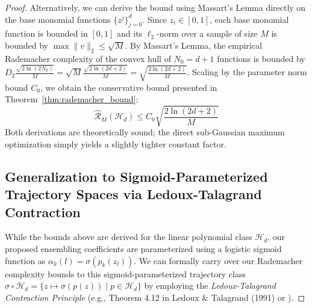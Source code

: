 \documentclass{article}
\theoremstyle{plain}
\theoremstyle{definition}
\theoremstyle{remark}
\begin{document}
\begin{proof}
Alternatively, we can derive the bound using Massart's Lemma directly on the base monomial functions $\{z^j\}_{j=0}^d$. Since $z_i \in [0, 1]$, each base monomial function is bounded in $[0, 1]$ and its $\ell_2$-norm over a sample of size $M$ is bounded by $\max \|v\|_2 \le \sqrt{M}$. By Massart's Lemma, the empirical Rademacher complexity of the convex hull of $N_0 = d+1$ functions is bounded by $D_2 \frac{\sqrt{2 \ln(2 N_0)}}{M} = \sqrt{M} \frac{\sqrt{2 \ln(2d+2)}}{M} = \sqrt{\frac{2 \ln(2d+2)}{M}}$. Scaling by the parameter norm bound $C_0$, we obtain the conservative bound presented in Theorem~\ref{thm:rademacher_bound}:
\begin{equation}
\widehat{\mathcal{R}}_M(\mathcal{H}_d) \le C_0 \sqrt{\frac{2 \ln(2 d + 2)}{M}}
\end{equation}
Both derivations are theoretically sound; the direct sub-Gaussian maximum optimization simply yields a slightly tighter constant factor.

\subsection{Generalization to Sigmoid-Parameterized Trajectory Spaces via Ledoux-Talagrand Contraction}
While the bounds above are derived for the linear polynomial class $\mathcal{H}_d$, our proposed ensembling coefficients are parameterized using a logistic sigmoid function as $\alpha_k(l) = \sigma(p_k(z_l))$. We can formally carry over our Rademacher complexity bounds to this sigmoid-parameterized trajectory class $\sigma \circ \mathcal{H}_d = \{ z \mapsto \sigma(p(z)) \mid p \in \mathcal{H}_d \}$ by employing the \emph{Ledoux-Talagrand Contraction Principle} (e.g., Theorem 4.12 in Ledoux \& Talagrand (1991) or \cite{shalev2014understanding}).


\end{proof}
\end{document}
